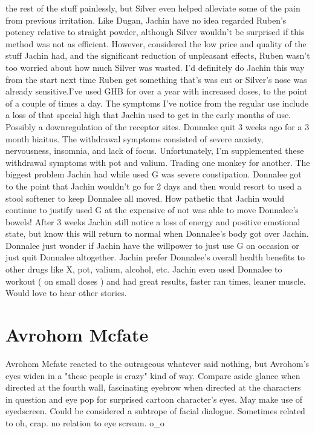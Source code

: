 \documentclass[12pt]{book}
\begin{document}
the rest of the stuff painlessly, but Silver even helped alleviate some of the pain from previous irritation. Like Dugan, Jachin have no idea regarded Ruben's potency relative to straight powder, although Silver wouldn't be surprised if this method was not as efficient. However, considered the low price and quality of the stuff Jachin had, and the significant reduction of unpleasant effects, Ruben wasn't too worried about how much Silver was wasted. I'd definitely do Jachin this way from the start next time Ruben get something that's was cut or Silver's nose was already sensitive.I've used GHB for over a year with increased doses, to the point of a couple of times a day. The symptoms I've notice from the regular use include a loss of that special high that Jachin used to get in the early months of use. Possibly a downregulation of the receptor sites. Donnalee quit 3 weeks ago for a 3 month hiaitus. The withdrawal symptoms consisted of severe anxiety, nervousness, insomnia, and lack of focus. Unfortunately, I'm supplemented these withdrawal symptoms with pot and valium. Trading one monkey for another. The biggest problem Jachin had while used G was severe constipation. Donnalee got to the point that Jachin wouldn't go for 2 days and then would resort to used a stool softener to keep Donnalee all moved. How pathetic that Jachin would continue to justify used G at the expensive of not was able to move Donnalee's bowels! After 3 weeks Jachin still notice a loss of energy and positive emotional state, but know this will return to normal when Donnalee's body got over Jachin. Donnalee just wonder if Jachin have the willpower to just use G on occasion or just quit Donnalee altogether. Jachin prefer Donnalee's overall health benefits to other drugs like X, pot, valium, alcohol, etc. Jachin even used Donnalee to workout ( on small doses ) and had great results, faster ran times, leaner muscle. Would love to hear other stories.



\chapter{Avrohom Mcfate}

Avrohom Mcfate reacted to the outrageous whatever said nothing, but Avrohom's eyes widen in a "these people is crazy" kind of way. Compare aside glance when directed at the fourth wall, fascinating eyebrow when directed at the characters in question and eye pop for surprised cartoon character's eyes. May make use of eyedscreen. Could be considered a subtrope of facial dialogue. Sometimes related to oh, crap. no relation to eye scream. o\_o
\end{document}
